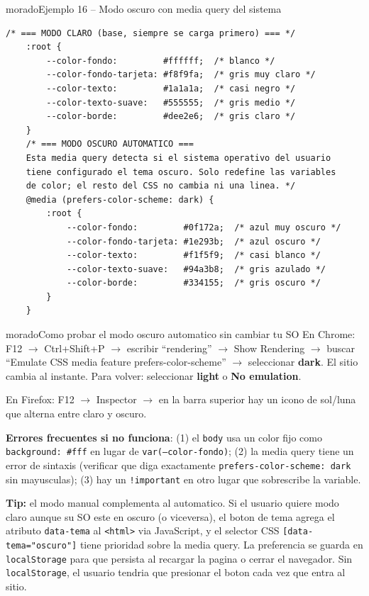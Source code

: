 \documentclass[11pt,a4paper]{article}
\begin{document}
	\begin{cajacodigo}{morado}{Ejemplo 16 -- Modo oscuro con media query del sistema}
		\begin{lstlisting}[style=codecss]
	/* === MODO CLARO (base, siempre se carga primero) === */
	:root {
		--color-fondo:         #ffffff;  /* blanco */
		--color-fondo-tarjeta: #f8f9fa;  /* gris muy claro */
		--color-texto:         #1a1a1a;  /* casi negro */
		--color-texto-suave:   #555555;  /* gris medio */
		--color-borde:         #dee2e6;  /* gris claro */
	}
	/* === MODO OSCURO AUTOMATICO ===
	Esta media query detecta si el sistema operativo del usuario
	tiene configurado el tema oscuro. Solo redefine las variables
	de color; el resto del CSS no cambia ni una linea. */
	@media (prefers-color-scheme: dark) {
		:root {
			--color-fondo:         #0f172a;  /* azul muy oscuro */
			--color-fondo-tarjeta: #1e293b;  /* azul oscuro */
			--color-texto:         #f1f5f9;  /* casi blanco */
			--color-texto-suave:   #94a3b8;  /* gris azulado */
			--color-borde:         #334155;  /* gris oscuro */
		}
	} \end{lstlisting}
	\end{cajacodigo}
	
	\begin{cajatip}{morado}{Como probar el modo oscuro automatico sin cambiar tu SO}
		En Chrome: F12 $\to$ Ctrl+Shift+P $\to$ escribir ``rendering'' $\to$ Show Rendering $\to$ buscar ``Emulate CSS media feature prefers-color-scheme'' $\to$ seleccionar \textbf{dark}. El sitio cambia al instante. Para volver: seleccionar \textbf{light} o \textbf{No emulation}.
		
		En Firefox: F12 $\to$ Inspector $\to$ en la barra superior hay un icono de sol/luna que alterna entre claro y oscuro.
		
		\textbf{Errores frecuentes si no funciona}: (1) el \texttt{body} usa un color fijo como \texttt{background: \#fff} en lugar de \texttt{var(--color-fondo)}; (2) la media query tiene un error de sintaxis (verificar que diga exactamente \texttt{prefers-color-scheme: dark} sin mayusculas); (3) hay un \texttt{!important} en otro lugar que sobrescribe la variable.
	\end{cajatip}
	
	\textbf{Tip:} el modo manual complementa al automatico. Si el usuario quiere modo claro aunque su SO este en oscuro (o viceversa), el boton de tema agrega el atributo \texttt{data-tema} al \texttt{<html>} via JavaScript, y el selector CSS \texttt{[data-tema="oscuro"]} tiene prioridad sobre la media query. La preferencia se guarda en \texttt{localStorage} para que persista al recargar la pagina o cerrar el navegador. Sin \texttt{localStorage}, el usuario tendria que presionar el boton cada vez que entra al sitio.
	
\end{document}
